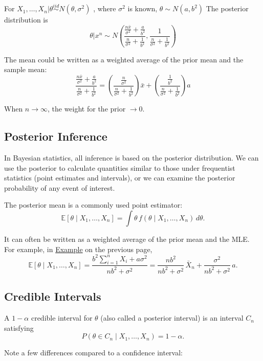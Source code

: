 \label{example:pg}
\begin{eb}
For $X_1,\dots,X_n | \theta \overset{iid}{\sim} N(\theta,\sigma^2)$ , where $\sigma^2$ is known, $\theta \sim N(a,b^2)$
The posterior distribution is
\[\theta | x^n \sim N\left(\dfrac{\frac{n\bar{x}}{\sigma^2} + \frac{a}{b^2}}{\frac{n}{\sigma^2} + \frac{1}{b^2}}, \dfrac{1}{\frac{n}{\sigma^2} + \frac{1}{b^2}}\right)\]

The mean could be written as a weighted average of the prior mean and the sample mean:
\[\dfrac{\frac{n\bar{x}}{\sigma^2} + \frac{a}{b^2}}{\frac{n}{\sigma^2} + \frac{1}{b^2}} = \left(\dfrac{\frac{n}{\sigma^2}}{\frac{n}{\sigma^2} + \frac{1}{b^2}}\right) \bar{x} + \left(\dfrac{\frac{1}{b^2}}{\frac{n}{\sigma^2} + \frac{1}{b^2}}\right) a\]

When $n \rightarrow \infty$, the weight for the prior $\rightarrow 0$.
\end{eb}
\subsection{Posterior Inference}

In Bayesian statistics, all inference is based on the posterior distribution.
We can use the posterior to calculate quantities similar to those under
frequentist statistics (point estimates and intervals), or we can examine the
posterior probability of any event of interest.

The posterior mean is a commonly used point estimator:
\[
\mathbb{E}[\theta \mid X_1, \dots, X_n]
=
\int \theta \, f(\theta \mid X_1, \dots, X_n)\, d\theta.
\]

It can often be written as a weighted average of the prior mean and the MLE.
For example, in \hyperref[example:pg]{Example} on the previous page,
\[
\mathbb{E}[\theta \mid X_1, \dots, X_n]
=
\frac{b^2 \sum_{i=1}^n X_i + a \sigma^2}{n b^2 + \sigma^2}
=
\frac{n b^2}{n b^2 + \sigma^2}\,\bar X_n
+
\frac{\sigma^2}{n b^2 + \sigma^2}\, a.
\]

\subsection{Credible Intervals}

A $1-\alpha$ credible interval for $\theta$ (also called a posterior interval)
is an interval $C_n$ satisfying
\[
P(\theta \in C_n \mid X_1, \dots, X_n) = 1 - \alpha.
\]

Note a few differences compared to a confidence interval:


